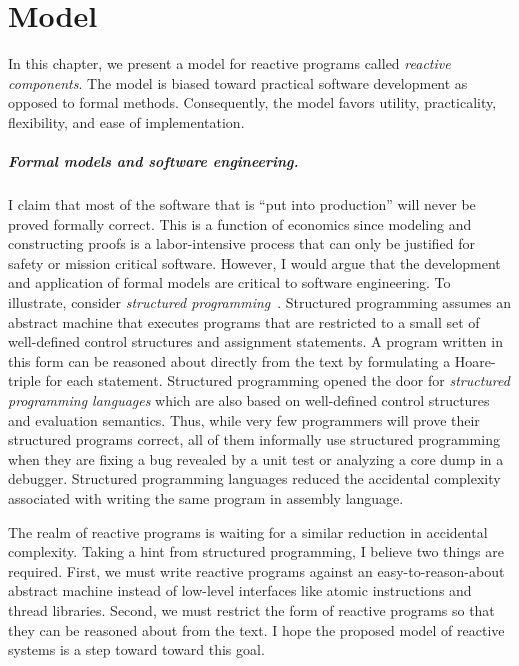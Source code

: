 \chapter{Model \label{model}}

In this chapter, we present a model for reactive programs called \emph{reactive components}.
The model is biased toward practical software development as opposed to formal methods.
Consequently, the model favors utility, practicality, flexibility, and ease of implementation.

\paragraph{Formal models and software engineering.}
I claim that most of the software that is ``put into production'' will never be proved formally correct.
This is a function of economics since modeling and constructing proofs is a labor-intensive process that can only be justified for safety or mission critical software.
However, I would argue that the development and application of formal models are critical to software engineering.
To illustrate, consider \emph{structured programming}~\cite{dahl1972structured}.
Structured programming assumes an abstract machine that executes programs that are restricted to a small set of well-defined control structures and assignment statements.
A program written in this form can be reasoned about directly from the text by formulating a Hoare-triple for each statement.
Structured programming opened the door for \emph{structured programming languages} which are also based on well-defined control structures and evaluation semantics.
Thus, while very few programmers will prove their structured programs correct, all of them informally use structured programming when they are fixing a bug revealed by a unit test or analyzing a core dump in a debugger.
Structured programming languages reduced the accidental complexity associated with writing the same program in assembly language.

The realm of reactive programs is waiting for a similar reduction in accidental complexity.
Taking a hint from structured programming, I believe two things are required.
First, we must write reactive programs against an easy-to-reason-about abstract machine instead of low-level interfaces like atomic instructions and thread libraries.
Second, we must restrict the form of reactive programs so that they can be reasoned about from the text.
I hope the proposed model of reactive systems is a step toward toward this goal.

